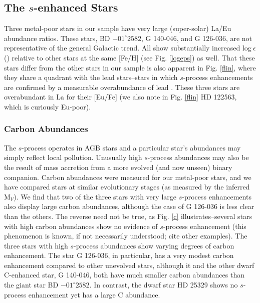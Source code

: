 \documentclass[12pt,preprint]{aastex}
\begin{document}
{\subsection{ The $s$-enhanced Stars}
Three metal-poor stars in our sample have very large (super-solar) La/Eu abundance ratios.  These stars, BD $-01^{\circ} 2582$, G 140-046, and G 126-036, are not representative of the general Galactic trend.  All show substantially increased log$~\epsilon$() relative to other stars at the same [Fe/H] (see Fig. \ref{logeps}) as well.  That these stars differ from the other stars in our sample is also apparent in Fig. \ref{flin}, where they share a quadrant with the lead stars--stars in which $s$-process enhancements are confirmed by a measurable overabundance of lead \citep{Aoki2002}.  These three stars are overabundant in La for their [Eu/Fe] (we also note in Fig. \ref{flin} HD 122563, which is curiously Eu-poor).

\subsubsection{Carbon Abundances \label{carbon}}
The $s$-process operates in AGB stars and a particular star's abundances  may simply reflect local pollution.  Unusually high $s$-process abundances may also be the result of mass accretion from a more evolved (and now unseen) binary companion.  Carbon abundances were measured for our metal-poor stars, and we have compared stars at similar evolutionary stages (as measured by the inferred M$_V$). We find that two of the three  stars with very large $s$-process enhancements  also display large carbon abundances, although the case of G 126-036 is less clear than the others.   The reverse need not be true, as Fig. \ref{c} illustrates--several stars with high carbon abundances show no evidence of $s$-process enhancement (this phenomenon is known, if not necessarily understood; \citealt{Dominy1985, Preston2001} cite other examples).   The three stars with high $s$-process abundances show varying degrees of carbon enhancement.   The star G 126-036, in particular, has a very modest carbon enhancement compared to other unevolved stars, although it and the other dwarf C-enhanced star, G 140-046, both have much smaller carbon abundances than the giant star BD $-01^{\circ} 2582$.  In contrast, the dwarf star HD 25329 shows no $s$-process enhancement yet has a large C abundance.

}
\end{document}
